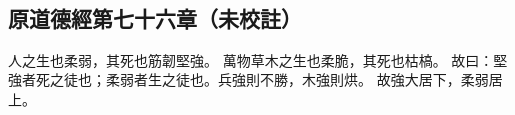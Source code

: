 ﻿%
%

\chapter{~}

\section{原道德經第七十六章（未校註）}

\begin{withgezhu}

\zhsong


人之生也柔弱，\textcolor{tongjia-color}{其死也筋韌堅強}。
萬物草木之生也柔脆，其死也枯槁。
故曰：堅強者死之徒也；柔弱者生之徒也。兵強則不勝，木強則烘。
故強大居下，柔弱居上。

\end{withgezhu}
